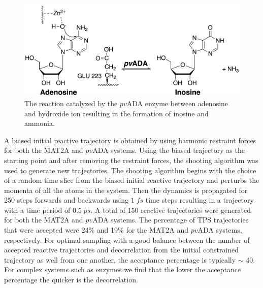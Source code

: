 \documentclass[journal=jpcbfk,manuscript=article,layout=traditional]{achemso}
\begin{document}
\begin{figure}
\includegraphics[width=\columnwidth]{figures/ada-reaction.png}
\caption{The reaction catalyzed by the $pv$ADA enzyme between adenosine and hydroxide ion
resulting in the formation of inosine and ammonia.}
\label{fig:ada-reaction}
\end{figure}

A biased initial reactive trajectory is obtained by using harmonic restraint forces 
for both the MAT2A and $pv$ADA systems. 
Using the biased trajectory as the starting point and after removing the restraint 
forces, the shooting algorithm \cite{dellago02AdvChemPhys123} was used to generate
new trajectories. The shooting algorithm begins with the choice of a 
random time slice from the biased initial reactive trajectory and perturbs 
the momenta of all the atoms in the system. Then the dynamics is propagated for 
250 steps forwards and backwards using $1\;fs$ time steps
resulting in a trajectory with a time period of $0.5\;ps$.
A total of 150 reactive trajectories were generated for both the MAT2A and $pv$ADA
systems. The percentage of TPS trajectories that were accepted were 24$\%$ and 
19$\%$ for the MAT2A and $pv$ADA systems, respectively.
For optimal sampling with a good balance between the number of 
accepted reactive trajectories and decorrelation from the initial constrained
trajectory as well from one another, the acceptance percentage 
is typically $\sim$ 40. \cite{dellago02AdvChemPhys123}  
For complex systems such as enzymes we find that the lower the acceptance 
percentage the quicker is the decorrelation. 
\end{document}

